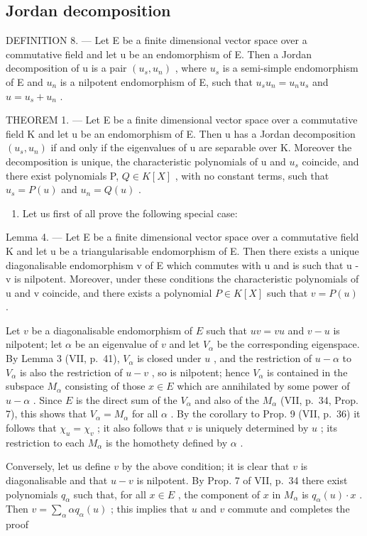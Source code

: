 \subsection{Jordan decomposition}

DEFINITION 8. --- Let E be a finite dimensional vector space over a commutative field and let u be an endomorphism of E. Then a Jordan decomposition of u is a pair \((u_{s}, u_{n})\) , where \(u_{s}\) is a semi-simple endomorphism of E and \(u_{n}\) is a nilpotent endomorphism of E, such that \(u_{s}u_{n} = u_{n}u_{s}\) and \(u = u_{s} + u_{n}\) .

THEOREM 1. --- Let E be a finite dimensional vector space over a commutative field K and let u be an endomorphism of E. Then u has a Jordan decomposition \((u_{s}, u_{n})\) if and only if the eigenvalues of u are separable over K. Moreover the decomposition is unique, the characteristic polynomials of u and \(u_{s}\) coincide, and there exist polynomials P, \(Q \in K[X]\) , with no constant terms, such that \(u_{s} = P(u)\) and \(u_{n} = Q(u)\) .

\begin{enumerate}
\def\labelenumi{\Alph{enumi})}
\tightlist
\item
  Let us first of all prove the following special case:
\end{enumerate}

Lemma 4. --- Let E be a finite dimensional vector space over a commutative field K and let u be a triangularisable endomorphism of E. Then there exists a unique diagonalisable endomorphism v of E which commutes with u and is such that u - v is nilpotent. Moreover, under these conditions the characteristic polynomials of u and v coincide, and there exists a polynomial \(P \in K[X]\) such that \(v = P(u)\) .

Let \(v\) be a diagonalisable endomorphism of \(E\) such that \(uv = vu\) and \(v - u\) is nilpotent; let \(\alpha\) be an eigenvalue of \(v\) and let \(V_{\alpha}\) be the corresponding eigenspace. By Lemma 3 (VII, p.~41), \(V_{\alpha}\) is closed under \(u\) , and the restriction of \(u - \alpha\) to \(V_{\alpha}\) is also the restriction of \(u - v\) , so is nilpotent; hence \(V_{\alpha}\) is contained in the subspace \(M_{\alpha}\) consisting of those \(x \in E\) which are annihilated by some power of \(u - \alpha\) . Since \(E\) is the direct sum of the \(V_{\alpha}\) and also of the \(M_{\alpha}\) (VII, p.~34, Prop. 7), this shows that \(V_{\alpha} = M_{\alpha}\) for all \(\alpha\) . By the corollary to Prop. 9 (VII, p.~36) it follows that \(\chi_u = \chi_v\) ; it also follows that \(v\) is uniquely determined by \(u\) ; its restriction to each \(M_{\alpha}\) is the homothety defined by \(\alpha\) .

Conversely, let us define \(v\) by the above condition; it is clear that \(v\) is diagonalisable and that \(u - v\) is nilpotent. By Prop. 7 of VII, p.~34 there exist polynomials \(q_{\alpha}\) such that, for all \(x \in E\) , the component of \(x\) in \(M_{\alpha}\) is \(q_{\alpha}(u) \cdot x\) . Then \(v = \sum_{\alpha} \alpha q_{\alpha}(u)\) ; this implies that \(u\) and \(v\) commute and completes the proof
